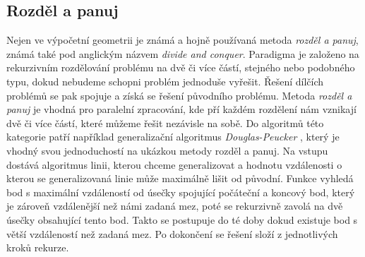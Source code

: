 \subsection{Rozděl a panuj}
	Nejen ve výpočetní geometrii je známá a hojně používaná metoda \textit{rozděl a panuj}, známá také pod anglickým názvem \textit{divide and conquer}. Paradigma je založeno na rekurzivním rozdělování problému na dvě či více částí, stejného nebo podobného typu, dokud nebudeme schopni problém jednoduše vyřešit. Řešení dílčích problémů se pak spojuje a získá se řešení původního problému. Metoda \textit{rozděl a panuj} je vhodná pro paralelní zpracování, kde pří každém rozdělení nám vznikají dvě či více částí, které můžeme řešit nezávisle na sobě. \cite{frigo1999cache}
	Do algoritmů této kategorie patří například generalizační algoritmus \textit{Douglas-Peucker} \cite{van1997algorithmic}, který je vhodný svou jednoduchostí na ukázkou metody rozděl a panuj. 
	Na vstupu dostává algoritmus linii, kterou chceme generalizovat a hodnotu vzdálenosti o kterou se generalizovaná linie může maximálně lišit od původní. Funkce vyhledá bod s maximální vzdáleností od úsečky spojující počáteční a koncový bod, který je zároveň vzdálenější než námi zadaná mez, poté se rekurzivně zavolá na dvě úsečky obsahující tento bod. Takto se postupuje do té doby dokud existuje bod s větší vzdáleností než zadaná mez. Po dokončení se řešení složí z jednotlivých  kroků rekurze.

